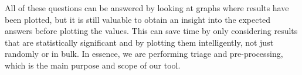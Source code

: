 All of these questions can be answered by looking at graphs where results have been plotted, but it is still valuable to
obtain an insight into the expected answers before plotting the values.
This can save time by only considering results that are statistically significant and by plotting them intelligently, not
just randomly or in bulk.
In essence, we are performing triage and pre-processing, which is the main purpose and scope of our tool.